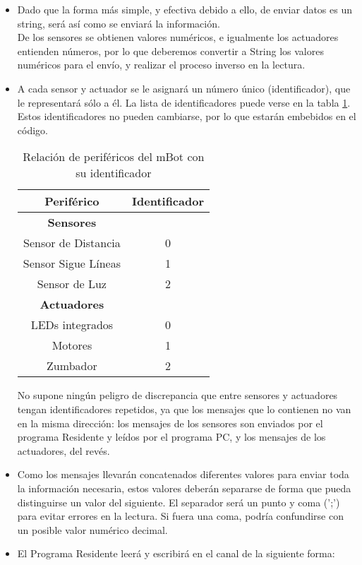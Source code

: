 \begin{itemize}		
	\item Dado que la forma más simple, y efectiva debido a ello, de enviar datos es un string, será así como se enviará la información. \\
	De los sensores se obtienen valores numéricos, e igualmente los actuadores entienden números, por lo que deberemos convertir a String los valores numéricos para el envío, y realizar el proceso inverso en la lectura.
	\item A cada sensor y actuador se le asignará un número único (identificador), que le representará sólo a él. La lista de identificadores puede verse en la tabla \ref{table:identificadoresperifericos}. Estos identificadores no pueden cambiarse, por lo que estarán embebidos en el código.
	\begin{table}[h]
		\centering
		\begin{tabular}{ c | c }
			\textbf{Periférico} & \textbf{Identificador} \\
			\hline	
			\textbf{Sensores} & \\
			\hline		
			Sensor de Distancia &  0\\
			Sensor Sigue Líneas & 1 \\
			Sensor de Luz & 2\\
			\hline
			\textbf{Actuadores} & \\
			\hline	
			LEDs integrados & 0\\
			Motores & 1\\
			Zumbador & 2 \\				
		\end{tabular}
		\caption{Relación de periféricos del mBot con su identificador}
		\label{table:identificadoresperifericos}
		\end{table} 
	No supone ningún peligro de discrepancia que entre sensores y actuadores tengan identificadores repetidos, ya que los mensajes que lo contienen no van en la misma dirección: los mensajes de los sensores son enviados por el programa Residente y leídos por el programa PC, y los mensajes de los actuadores, del revés.
	\item Como los mensajes llevarán concatenados diferentes valores para enviar toda la información necesaria, estos valores deberán separarse de forma que pueda distinguirse un valor del siguiente. El separador será un punto y coma (';') para evitar errores en la lectura. Si fuera una coma, podría confundirse con un posible valor numérico decimal.
	\item El Programa Residente leerá y escribirá en el canal de la siguiente forma:

\end{itemize}
